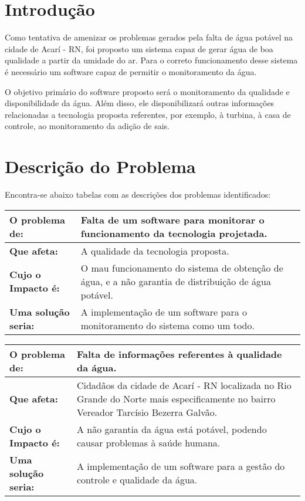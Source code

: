\section*{Introdução}
Como tentativa de amenizar os problemas gerados pela falta de água potável na cidade de Acarí - RN, foi proposto um sistema capaz de gerar água de boa qualidade a partir da umidade do ar. Para o correto funcionamento desse sistema é necessário um software capaz de permitir o monitoramento da água.

O objetivo primário do software proposto será o monitoramento da qualidade e disponibilidade da água. Além disso, ele disponibilizará outras informações relacionadas a tecnologia proposta referentes, por exemplo, à turbina, à casa de controle, ao monitoramento da adição de sais.

\section*{Descrição do Problema}
Encontra-se abaixo tabelas com as descrições dos problemas identificados:
\begin{table}[!t]
\centering
\begin{tabular}{|p{4cm}|p{10cm}|}\hline
\textbf{O problema de:}&Falta de um software para monitorar o funcionamento da tecnologia projetada.\\ \hline
\textbf{Que afeta:}&A qualidade da tecnologia proposta.\\ \hline
\textbf{Cujo o Impacto é:}&	O mau funcionamento do sistema de obtenção de água, e a não garantia de distribuição de água potável.\\ \hline
\textbf{Uma solução seria:}&	A implementação de um software para o monitoramento do sistema como um todo.\\ \hline

\end{tabular}
\end{table}

\begin{table}[!t]
\centering
\begin{tabular}{|p{4cm}|p{10cm}|}\hline
\textbf{O problema de:}&Falta de informações referentes à qualidade da água.\\ \hline
\textbf{Que afeta:}&Cidadãos da cidade de Acarí - RN localizada no Rio Grande do Norte mais especificamente no bairro Vereador Tarcísio Bezerra Galvão.\\ \hline
\textbf{Cujo o Impacto é:}&A não garantia da água está potável, podendo causar problemas à saúde humana.\\ \hline
\textbf{Uma solução seria:}&	A implementação de um software para a gestão do controle e qualidade da água.\\ \hline
\end{tabular}
\end{table}

